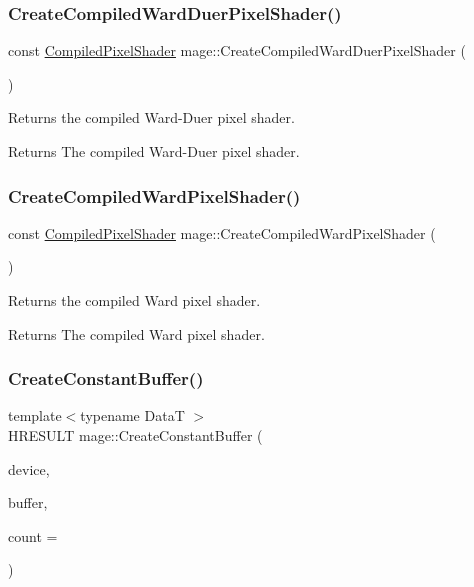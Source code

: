 \subsubsection{\texorpdfstring{Create\+Compiled\+Ward\+Duer\+Pixel\+Shader()}{CreateCompiledWardDuerPixelShader()}}
{\footnotesize\ttfamily const \hyperlink{structmage_1_1_compiled_pixel_shader}{Compiled\+Pixel\+Shader} mage\+::\+Create\+Compiled\+Ward\+Duer\+Pixel\+Shader (\begin{DoxyParamCaption}{ }\end{DoxyParamCaption})}

Returns the compiled Ward-\/\+Duer pixel shader.

\begin{DoxyReturn}{Returns}
The compiled Ward-\/\+Duer pixel shader. 
\end{DoxyReturn}
\hypertarget{namespacemage_a05ea56b2492dbb8c3495a1ac2f007204}{}\label{namespacemage_a05ea56b2492dbb8c3495a1ac2f007204} 
\subsubsection{\texorpdfstring{Create\+Compiled\+Ward\+Pixel\+Shader()}{CreateCompiledWardPixelShader()}}
{\footnotesize\ttfamily const \hyperlink{structmage_1_1_compiled_pixel_shader}{Compiled\+Pixel\+Shader} mage\+::\+Create\+Compiled\+Ward\+Pixel\+Shader (\begin{DoxyParamCaption}{ }\end{DoxyParamCaption})}

Returns the compiled Ward pixel shader.

\begin{DoxyReturn}{Returns}
The compiled Ward pixel shader. 
\end{DoxyReturn}
\hypertarget{namespacemage_a5eed34f604a40811bb0282dff7e6e712}{}\label{namespacemage_a5eed34f604a40811bb0282dff7e6e712} 
\subsubsection{\texorpdfstring{Create\+Constant\+Buffer()}{CreateConstantBuffer()}}
{\footnotesize\ttfamily template$<$typename DataT $>$ \\
H\+R\+E\+S\+U\+LT mage\+::\+Create\+Constant\+Buffer (\begin{DoxyParamCaption}\item[{I\+D3\+D11\+Device2 $\ast$}]{device,  }\item[{I\+D3\+D11\+Buffer $\ast$$\ast$}]{buffer,  }\item[{size\+\_\+t}]{count = {} }\end{DoxyParamCaption})}

